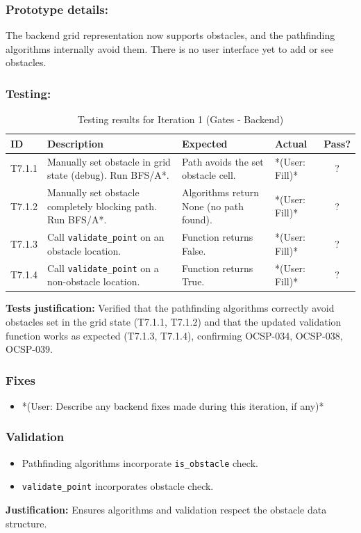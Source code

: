 \newpage
\subsubsection{Prototype details:}
The backend grid representation now supports obstacles, and the pathfinding algorithms internally avoid them. There is no user interface yet to add or see obstacles.

\subsubsection{Testing:} %
\begin{table}[htbp]
	\centering
	\begin{tabularx}{\textwidth}{|l|X|p{4.5cm}|p{1.5cm}|c|}
		\hline
		\textbf{ID} & \textbf{Description} & \textbf{Expected} & \textbf{Actual} & \textbf{Pass?} \\
		\hline
		T7.1.1 & Manually set obstacle in grid state (debug). Run BFS/A*. & Path avoids the set obstacle cell. & *(User: Fill)* & ? \\
		\hline
		T7.1.2 & Manually set obstacle completely blocking path. Run BFS/A*. & Algorithms return None (no path found). & *(User: Fill)* & ? \\
		\hline
		T7.1.3 & Call \verb|validate_point| on an obstacle location. & Function returns False. & *(User: Fill)* & ? \\
		\hline
		T7.1.4 & Call \verb|validate_point| on a non-obstacle location. & Function returns True. & *(User: Fill)* & ? \\
		\hline
	\end{tabularx}
	\caption{Testing results for Iteration 1 (Gates - Backend)}
\end{table}
\textbf{Tests justification:} Verified that the pathfinding algorithms correctly avoid obstacles set in the grid state (T7.1.1, T7.1.2) and that the updated validation function works as expected (T7.1.3, T7.1.4), confirming OCSP-034, OCSP-038, OCSP-039.

\subsubsection{Fixes}
\begin{itemize}
	\item *(User: Describe any backend fixes made during this iteration, if any)*
\end{itemize}

\subsubsection{Validation}
\begin{itemize}
	\item Pathfinding algorithms incorporate \verb|is_obstacle| check.
	\item \verb|validate_point| incorporates obstacle check.
\end{itemize}
\textbf{Justification:} Ensures algorithms and validation respect the obstacle data structure.

